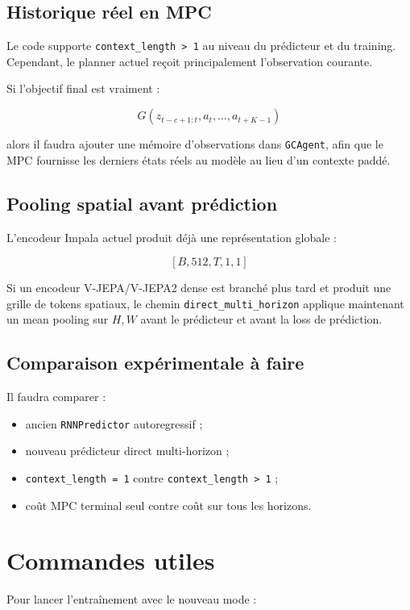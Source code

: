 \documentclass[11pt,a4paper]{article}
\newcommand{\code}[1]{\texttt{#1}}
\begin{document}
\subsection{Historique réel en MPC}

Le code supporte \code{context\_length > 1} au niveau du prédicteur et du training.
Cependant, le planner actuel reçoit principalement l'observation courante.

Si l'objectif final est vraiment :

\[
G(z_{t-c+1:t}, a_t,\dots,a_{t+K-1})
\]

alors il faudra ajouter une mémoire d'observations dans \code{GCAgent}, afin que le MPC
fournisse les derniers états réels au modèle au lieu d'un contexte paddé.

\subsection{Pooling spatial avant prédiction}

L'encodeur Impala actuel produit déjà une représentation globale :

\[
[B, 512, T, 1, 1]
\]

Si un encodeur V-JEPA/V-JEPA2 dense est branché plus tard et produit une grille de tokens
spatiaux, le chemin \code{direct\_multi\_horizon} applique maintenant un mean pooling
sur \(H,W\) avant le prédicteur et avant la loss de prédiction.

\subsection{Comparaison expérimentale à faire}

Il faudra comparer :

\begin{itemize}
  \item ancien \code{RNNPredictor} autoregressif ;
  \item nouveau prédicteur direct multi-horizon ;
  \item \code{context\_length = 1} contre \code{context\_length > 1} ;
  \item coût MPC terminal seul contre coût sur tous les horizons.
\end{itemize}

\section{Commandes utiles}

Pour lancer l'entraînement avec le nouveau mode :
\end{document}
